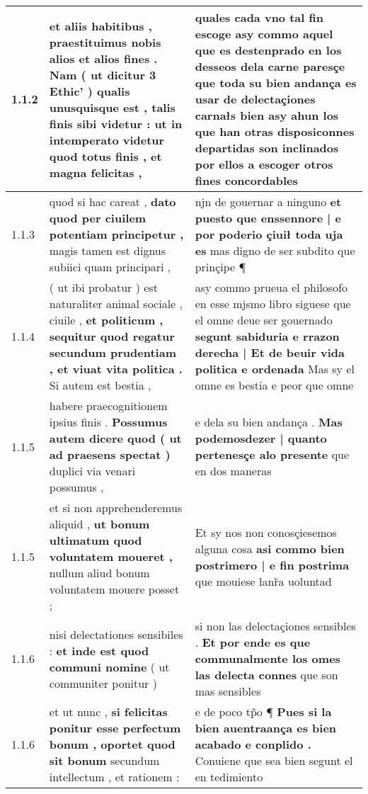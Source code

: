 \begin{tabular}{|p{1cm}|p{6.5cm}|p{6.5cm}|}

\hline
1.1.2 & et aliis habitibus , praestituimus nobis alios et alios fines . Nam ( ut dicitur 3 Ethic’ ) qualis unusquisque est , talis finis sibi videtur : \textbf{ ut in intemperato videtur quod totus finis , } et magna felicitas , & quales cada vno tal fin escoge \textbf{ asy commo aquel que es destenprado en los desseos dela carne paresçe } que toda su bien andança es usar de delectaçiones carnałs bien asy ahun los que han otras disposiconnes departidas son inclinados por ellos a escoger otros fines concordables \\\hline
1.1.3 & quod si hac careat , \textbf{ dato quod per ciuilem potentiam principetur , } magis tamen est dignus subiici quam principari , & njn de gouernar a ninguno \textbf{ et puesto que enssennore | e por poderio çiuił toda uja es } mas digno de ser subdito que prinçipe ¶ \\\hline
1.1.4 & ( ut ibi probatur ) est naturaliter animal sociale , ciuile , \textbf{ et politicum , sequitur quod regatur secundum prudentiam , et viuat vita politica . } Si autem est bestia , & asy commo prueua el philosofo en esse mjsmo libro siguese que el omne deue ser gouernado \textbf{ segunt sabiduria e rrazon derecha | Et de beuir vida politica e ordenada } Mas sy el omne es bestia e peor que omne \\\hline
1.1.5 & habere praecognitionem ipsius finis . \textbf{ Possumus autem dicere quod ( ut ad praesens spectat ) } duplici via venari possumus , & e dela su bien andança . \textbf{ Mas podemosdezer | quanto pertenesçe alo presente } que en dos maneras \\\hline
1.1.5 & et si non apprehenderemus aliquid , \textbf{ ut bonum ultimatum quod voluntatem moueret , } nullum aliud bonum voluntatem mouere posset ; & Et sy nos non conosçiesemos alguna cosa \textbf{ asi commo bien postrimero | e fin postrima } que mouiese lanr̃a uoluntad \\\hline
1.1.6 & nisi delectationes sensibiles : \textbf{ et inde est quod communi nomine } ( ut communiter ponitur ) & si non las delectaçiones sensibles . \textbf{ Et por ende es que communalmente los omes las delecta connes } que son mas sensibles \\\hline
1.1.6 & et ut nunc , \textbf{ si felicitas ponitur esse perfectum bonum , oportet quod sit bonum } secundum intellectum , et rationem : & e de poco tp̃o ¶ \textbf{ Pues si la bien auentraança es bien acabado e conplido . } Conuiene que sea bien segunt el en tedimiento \\\hline

\end{tabular}
